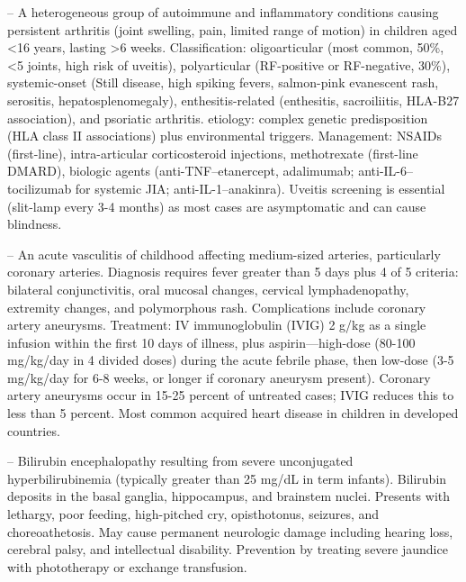 -- A heterogeneous group of autoimmune and inflammatory conditions causing persistent arthritis (joint swelling, pain, limited range of motion) in children aged <16 years, lasting >6 weeks. Classification: oligoarticular (most common, 50\%, <5 joints, high risk of uveitis), polyarticular (RF-positive or RF-negative, 30\%), systemic-onset (Still disease, high spiking fevers, salmon-pink evanescent rash, serositis, hepatosplenomegaly), enthesitis-related (enthesitis, sacroiliitis, HLA-B27 association), and psoriatic arthritis. etiology: complex genetic predisposition (HLA class II associations) plus environmental triggers. Management: NSAIDs (first-line), intra-articular corticosteroid injections, methotrexate (first-line DMARD), biologic agents (anti-TNF--etanercept, adalimumab; anti-IL-6--tocilizumab for systemic JIA; anti-IL-1--anakinra). Uveitis screening is essential (slit-lamp every 3-4 months) as most cases are asymptomatic and can cause blindness.

-- An acute vasculitis of childhood affecting medium-sized arteries, particularly coronary arteries. Diagnosis requires fever greater than 5 days plus 4 of 5 criteria: bilateral conjunctivitis, oral mucosal changes, cervical lymphadenopathy, extremity changes, and polymorphous rash. Complications include coronary artery aneurysms. Treatment: IV immunoglobulin (IVIG) 2 g/kg as a single infusion within the first 10 days of illness, plus aspirin---high-dose (80-100 mg/kg/day in 4 divided doses) during the acute febrile phase, then low-dose (3-5 mg/kg/day for 6-8 weeks, or longer if coronary aneurysm present). Coronary artery aneurysms occur in 15-25 percent of untreated cases; IVIG reduces this to less than 5 percent. Most common acquired heart disease in children in developed countries.

-- Bilirubin encephalopathy resulting from severe unconjugated hyperbilirubinemia (typically greater than 25 mg/dL in term infants). Bilirubin deposits in the basal ganglia, hippocampus, and brainstem nuclei. Presents with lethargy, poor feeding, high-pitched cry, opisthotonus, seizures, and choreoathetosis. May cause permanent neurologic damage including hearing loss, cerebral palsy, and intellectual disability. Prevention by treating severe jaundice with phototherapy or exchange transfusion.


